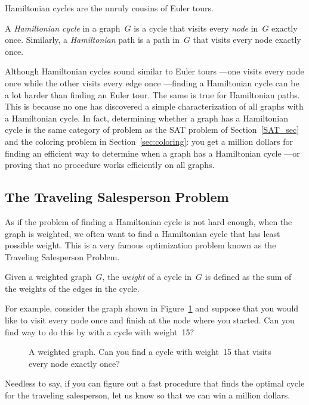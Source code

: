 \begin{editingnotes}
Hamiltonian cycles are the unruly cousins of Euler tours.

\begin{definition}\label{def:hamiltonian-cycle}
A \emph{Hamiltonian cycle} in a graph~$G$ is a cycle that visits every
\emph{node} in~$G$ exactly once.  Similarly, a \emph{Hamiltonian} path
is a path in~$G$ that visits every node exactly once.
\end{definition}

Although Hamiltonian cycles sound similar to Euler tours ---one visits
every node once while the other visits every edge once ---finding a
Hamiltonian cycle can be a lot harder than finding an Euler tour.  The
same is true for Hamiltonian paths.  This is because no one has
discovered a simple characterization of all graphs with a Hamiltonian
cycle.  In fact, determining whether a graph has a Hamiltonian cycle
is the same category of problem as the SAT problem of
Section~\ref{SAT_sec} and the coloring problem in
Section~\ref{sec:coloring}: you get a million dollars for finding an
efficient way to determine when a graph has a Hamiltonian cycle ---or
proving that no procedure works efficiently on all graphs.

\subsection{The Traveling Salesperson Problem}

As if the problem of finding a Hamiltonian cycle is not hard enough,
when the graph is weighted, we often want to find a Hamiltonian cycle
that has least possible weight.  This is a very famous optimization
problem known as the Traveling Salesperson Problem.

\begin{definition}
Given a weighted graph~$G$, the \emph{weight} of a cycle in~$G$ is
defined as the sum of the weights of the edges in the cycle.
\end{definition}

For example, consider the graph shown in Figure~\ref{fig:5AL} and
suppose that you would like to visit every node once and finish at the
node where you started.  Can you find  way to do this by with a
cycle with weight~15?

\begin{figure}


\caption{A weighted graph.  Can you find a cycle with weight~15 that
  visits every node exactly once?}

\label{fig:5AL}
\end{figure}

Needless to say, if you can figure out a fast procedure that finds the
optimal cycle for the traveling salesperson, let us know so that we
can win a million dollars.
\end{editingnotes}

